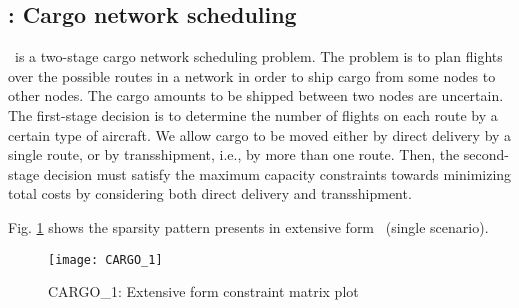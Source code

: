 \subsection{\cargo: Cargo network scheduling} \label{CARGO}
\cargo\ is a two-stage cargo network scheduling problem. The problem is to plan flights over the possible routes in a network in order to ship cargo from some nodes to other nodes. The cargo amounts to be shipped between two nodes are uncertain. The first-stage decision is to determine the number of flights on each route by a certain type of aircraft. We allow cargo to be moved either by direct delivery by a single route, or by transshipment, i.e., by more than one route. Then, the second-stage decision must satisfy the maximum capacity constraints towards minimizing total costs by considering both direct delivery and transshipment.

Fig. \ref{fig:cargo_sparsity} shows the sparsity pattern presents in extensive form \cargo\ (single scenario).
\begin{figure}[H]
	\centering
	\texttt{[image: CARGO\_1]}
	\caption{CARGO\_1: Extensive form constraint matrix plot}
	\label{fig:cargo_sparsity}
\end{figure}
